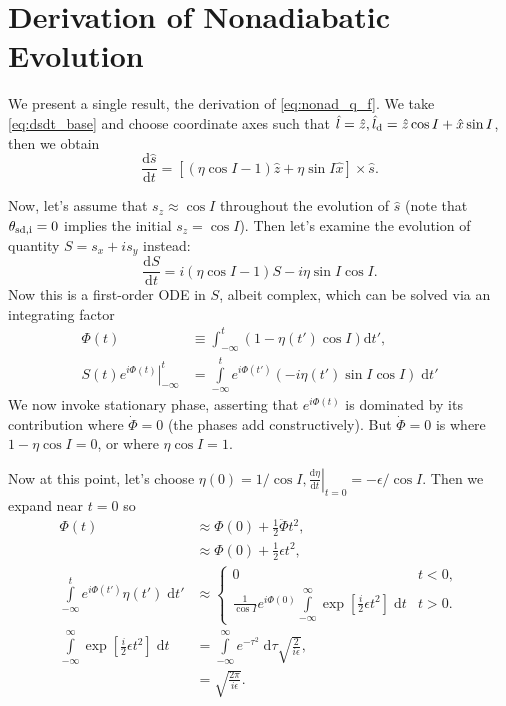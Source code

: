\documentclass[
        fleqn,
        usenatbib,
        referee,
    ]{mnras}
\newcommand*{\rd}[2]{\frac{\mathrm{d}#1}{\mathrm{d}#2}}
\newcommand*{\at}[1]{\left.#1\right|}
\newcommand*{\p}[1]{\left(#1\right)}
\newcommand*{\s}[1]{\left[#1\right]}
\begin{document}
\section{Derivation of Nonadiabatic Evolution}\label{s:nonad_app}

We present a single result, the derivation of \autoref{eq:nonad_q_f}. We take
\autoref{eq:dsdt_base} and choose coordinate axes such that $\hat{l} = \hat{z},
\hat{l}_{\rm d} = \hat{z} \cos I + \hat{x}\sin I$, then we obtain
\begin{equation}
    \rd{\hat{s}}{t} = \s{
        \p{\eta \cos I - 1}\hat{z} + \eta \sin I \hat{x}} \times \hat{s}.
\end{equation}

Now, let's assume that $s_z \approx \cos I$ throughout the evolution of
$\hat{s}$ (note that $\theta_{\rm sd, i} = 0$ implies the initial $s_z = \cos
I$). Then let's examine the evolution of quantity $S = s_x + is_y$ instead:
\begin{equation}
    \rd{S}{t} = i\p{\eta\cos I - 1}S - i \eta \sin I\cos I.\label{eq:nonad_ode}
\end{equation}
Now this is a first-order ODE in $S$, albeit complex, which can be solved via
an integrating factor
\begin{align}
    \Phi(t) &\equiv \int_{-\infty}^t \p{1 - \eta(t') \cos I}
        \mathrm{d}t',\\
    \at{S(t) e^{i\Phi(t)}}_{-\infty}^t
        &= \int\limits_{-\infty}^t e^{i\Phi(t')}
            \p{-i\eta(t')\sin I\cos I}\;\mathrm{d}t'\label{eq:nonad_int}
\end{align}
We now invoke stationary phase, asserting that $e^{i\Phi(t)}$ is dominated by
its contribution where $\dot{\Phi} = 0$ (the phases add constructively). But
$\dot{\Phi} = 0$ is where $1 - \eta\cos I = 0$, or where $\eta\cos I = 1$.

Now at this point, let's choose $\eta(0) = 1/\cos I, \at{\rd{\eta}{t}}_{t=0} =
-\epsilon/\cos I$. Then we expand near $t = 0$ so
\begin{align}
    \Phi(t) &\approx \Phi(0) + \frac{1}{2}\ddot{\Phi}t^2,\\
        &\approx \Phi(0) + \frac{1}{2}\epsilon t^2,\\
    \int\limits_{-\infty}^t e^{i\Phi(t')}\eta(t')\;\mathrm{d}t'
        &\approx
        \begin{cases}
            0 & t < 0,\\
            \frac{1}{\cos I}e^{i\Phi(0)}\int\limits_{-\infty}^\infty
                \exp\s{\frac{i}{2}\epsilon t^2}\;\mathrm{d}t
                & t > 0.
        \end{cases}\\
    \int\limits_{-\infty}^\infty
                \exp\s{\frac{i}{2}\epsilon t^2}\;\mathrm{d}t
        &= \int\limits_{-\infty}^\infty e^{-\tau^2}\;\mathrm{d}\tau
            \sqrt{\frac{2}{i\epsilon}},\\
        &= \sqrt{\frac{2\pi}{i\epsilon}}.
\end{align}
\end{document}
